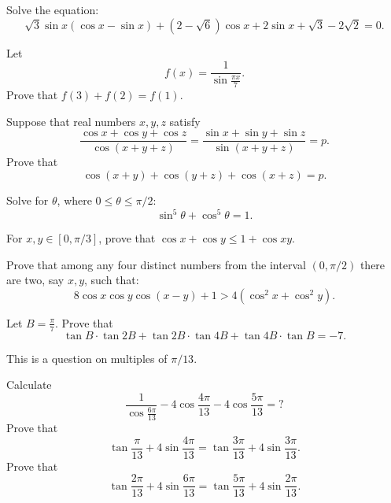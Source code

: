 \documentclass[12pt,a4paper]{memoir}
\theoremstyle{definition}
\begin{document}
\begin{question} Solve the equation:
	\[ \sqrt {3} \sin x ( \cos x- \sin x ) + (2- \sqrt {6} ) \cos x+ 2 \sin x+ \sqrt {3} - 2 \sqrt {2} = 0.\]
\end{question}



\begin{question} Let $$f(x)=\displaystyle\frac{1}{\displaystyle \sin\frac{\pi x}{7}}.$$ Prove that $ f(3)+f(2)=f(1).$
\end{question}




\begin{question} Suppose that real numbers $ x,y,z$ satisfy
	\[ \dfrac{\cos{x}+\cos{y}+\cos{z}}{\cos{(x+y+z)}}=\dfrac{\sin{x}+\sin{y}+\sin{z}}{\sin{(x+y+z)}}=p.\]
	Prove that \[ \cos{(x+y)}+\cos{(y+z)}+\cos{(x+z)}=p.\]
\end{question}



\begin{question} Solve for $ \theta$, where $0 \le \theta \leq \pi/2$:
	\[ \sin^5 \theta + \cos^5 \theta =1.\]
\end{question}


\begin{question} For $ x,y\in [0, \pi/3]$, prove that $ \cos x+\cos y\leq 1+\cos xy$.
\end{question}



\begin{question} Prove that among any four distinct numbers from the interval $ (0,\pi/2)$ there are two, say $x,y$, such that:
	\[8 \cos x \cos y \cos (x-y)+1>4(\cos ^2 x+\cos ^2 y).\]
\end{question}



\begin{question} Let $ B= \frac{\pi}{7}.$ Prove that
	\[ \tan B \cdot \tan 2B +  \tan 2B \cdot \tan 4B + \tan 4B \cdot \tan B=-7.\]
\end{question}


\begin{question} 
	This is a question on multiples of $\pi/13$.
	\begin{tasks}
		\task Calculate
		\[ \frac {1}{{\cos \frac {{6\pi }}{{13}}}} - 4\cos \frac {{4\pi }}{{13}} - 4\cos \frac {{5\pi }}{{13}} = ?
		\]
		\task Prove that
		\[ \tan\frac {\pi }{{13}} + 4\sin \frac {{4\pi }}{{13}} = \tan\frac {{3\pi }}{{13}} + 4\sin \frac {{3\pi }}{{13}}.
		\]
		\task Prove that
		\[ \tan\frac {{2\pi }}{{13}} + 4\sin \frac {{6\pi }}{{13}} = \tan\frac {{5\pi }}{{13}} + 4\sin \frac {{2\pi }}{{13}}.
		\]
	\end{tasks}
\end{question}
\end{document}
